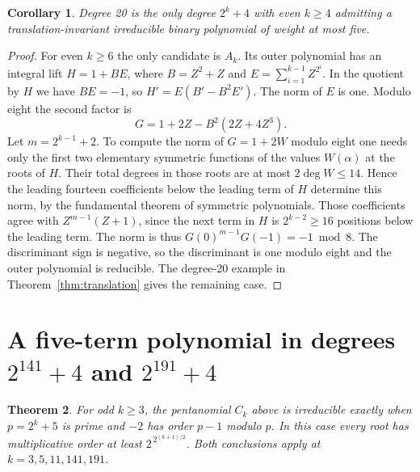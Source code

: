 \documentclass[11pt]{article}
\newtheorem{theorem}{Theorem}
\newtheorem{corollary}[theorem]{Corollary}
\begin{document}
\begin{corollary}
Degree 20 is the only degree \(2^k+4\) with even \(k\ge4\) admitting
a translation-invariant irreducible binary polynomial of weight at
most five.
\end{corollary}
\begin{proof}
For even \(k\ge6\) the only candidate is \(A_k\). Its outer polynomial
has an integral lift \(H=1+BE\), where \(B=Z^2+Z\) and
\(E=\sum_{i=1}^{k-1}Z^{2^i}\). In the quotient by \(H\) we have
\(BE=-1\), so \(H'=E(B'-B^2 E')\). The norm of \(E\) is one.
Modulo eight the second factor is
\[
 G=1+2Z-B^2(2Z+4Z^3).
\]
Let \(m=2^{k-1}+2\). To compute the norm of \(G=1+2W\) modulo eight
one needs only the first two elementary symmetric functions of the
values \(W(\alpha)\) at the roots of \(H\). Their total degrees in
those roots are at most \(2\deg W\le14\). Hence the leading fourteen
coefficients below the leading term of \(H\) determine this norm,
by the fundamental theorem of symmetric polynomials. Those
coefficients agree with \(Z^{m-1}(Z+1)\), since the next term in
\(H\) is \(2^{k-2}\ge16\) positions below the leading term.
The norm is thus \(G(0)^{m-1}G(-1)=-1\bmod8\). The discriminant
sign is negative, so the discriminant is one modulo eight and the
outer polynomial is reducible. The degree-20 example in
Theorem~\ref{thm:translation} gives the remaining case.
\end{proof}

\section{A five-term polynomial in degrees \texorpdfstring{\(2^{141}+4\) and \(2^{191}+4\)}{2^141+4 and 2^191+4}}
\label{sec:twisted-torus}

\begin{theorem}
For odd \(k\ge3\), the pentanomial \(C_k\) above is irreducible
exactly when \(p=2^k+5\) is prime and \(-2\) has order \(p-1\)
modulo \(p\). In this case every root has multiplicative order at
least \(2^{\,2^{(k+1)/2}}\). Both conclusions apply at
\(k=3,5,11,141,191\).
\end{theorem}
\end{document}
